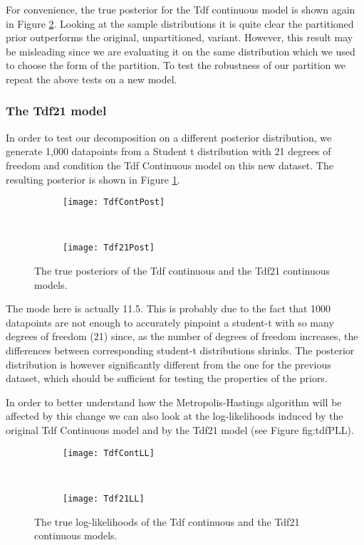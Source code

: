 For convenience, the true posterior for the Tdf continuous model is shown again in Figure \ref{fig:tdfPLL}. Looking at the sample distributions it is quite clear the partitioned prior outperforms the original, unpartitioned, variant. However, this result may be misleading since we are evaluating it on the same distribution which we used to choose the form of the partition. To test the robustness of our partition we repeat the above tests on a new model.

\subsubsection{The Tdf21 model}
In order to test our decomposition on a different posterior distribution, we generate 1,000 datapoints from a Student t distribution with 21 degrees of freedom and condition the Tdf Continuous model on this new dataset. The resulting posterior is shown in Figure \ref{fig:tdfPPost}.

\begin{figure}[h]
    \centering
    \begin{subfigure}[t]{0.48\textwidth}
      \texttt{[image: TdfContPost]}
    \end{subfigure}
    ~
    \begin{subfigure}[t]{0.48\textwidth}
      \texttt{[image: Tdf21Post]}
    \end{subfigure}
    \caption{The true posteriors of the Tdf continuous and the Tdf21 continuous models.}
    \label{fig:tdfPPost}
\end{figure}

The mode here is actually 11.5. This is probably due to the fact that 1000 datapoints are not enough to accurately pinpoint a student-t with so many degrees of freedom (21) since, as the number of degrees of freedom increases, the differences between corresponding student-t distributions shrinks. 
The posterior distribution is however significantly different from the one for the previous dataset, which should be sufficient for testing the properties of the priors.

In order to better understand how the Metropolis-Hastings algorithm will be affected by this change we can also look at the log-likelihoods induced by the original Tdf Continuous model and by the Tdf21 model (see Figure {fig:tdfPLL}).

\begin{figure}[h]
    \centering
    \begin{subfigure}[t]{0.48\textwidth}
      \texttt{[image: TdfContLL]}
    \end{subfigure}
    ~
    \begin{subfigure}[t]{0.48\textwidth}
      \texttt{[image: Tdf21LL]}
    \end{subfigure}
    \caption{The true log-likelihoods of the Tdf continuous and the Tdf21 continuous models.}
    \label{fig:tdfPLL}
\end{figure}

